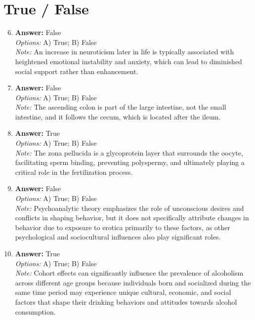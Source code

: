 \documentclass[12pt]{article}
\begin{document}
\section*{True / False}
\begin{enumerate}[label=\arabic*.]
\setcounter{enumi}{5}
\item \textbf{Answer:} False
\\ \textit{Options:} A) True; B) False
\\ \textit{Note:} An increase in neuroticism later in life is typically associated with heightened emotional instability and anxiety, which can lead to diminished social support rather than enhancement.
\item \textbf{Answer:} False
\\ \textit{Options:} A) True; B) False
\\ \textit{Note:} The ascending colon is part of the large intestine, not the small intestine, and it follows the cecum, which is located after the ileum.
\item \textbf{Answer:} True
\\ \textit{Options:} A) True; B) False
\\ \textit{Note:} The zona pellucida is a glycoprotein layer that surrounds the oocyte, facilitating sperm binding, preventing polyspermy, and ultimately playing a critical role in the fertilization process.
\item \textbf{Answer:} False
\\ \textit{Options:} A) True; B) False
\\ \textit{Note:} Psychoanalytic theory emphasizes the role of unconscious desires and conflicts in shaping behavior, but it does not specifically attribute changes in behavior due to exposure to erotica primarily to these factors, as other psychological and sociocultural influences also play significant roles.
\item \textbf{Answer:} True
\\ \textit{Options:} A) True; B) False
\\ \textit{Note:} Cohort effects can significantly influence the prevalence of alcoholism across different age groups because individuals born and socialized during the same time period may experience unique cultural, economic, and social factors that shape their drinking behaviors and attitudes towards alcohol consumption.
\end{enumerate}
\end{document}
